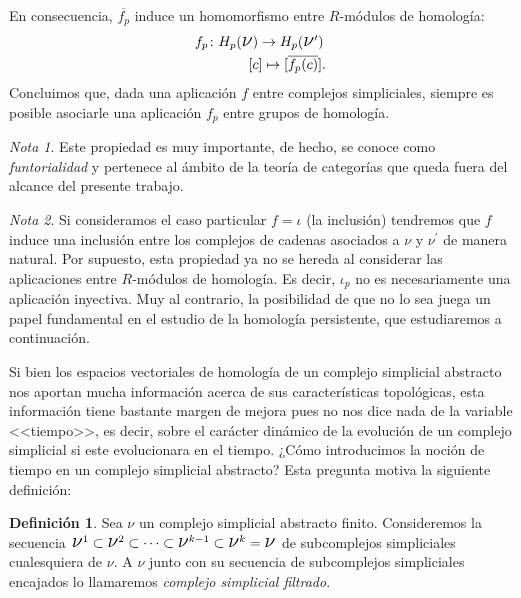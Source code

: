 \documentclass[12pt, a4paper, twoside]{book}
\numberwithin{equation}{section}
\theoremstyle{definition}
\newtheorem{defi}{Definición}[section]
\theoremstyle{remark}
\newtheorem*{remark}{Nota}
\theoremstyle{plain}
\begin{document}
	En consecuencia, $\overline{f_{p}}$ induce un 
	homomorfismo entre $R$-módulos de homología:	
		\begin{align*}
			\left.
			\begin{array}{l}
				f_{p}\colon H_{p}(\text{{\Large $\nu$}})
				\rightarrow 
				H_{p}(\text{{\Large $\nu$}}')\\[3pt] 
				\hspace{1.35cm} [c] \mapsto [\overline{f_{p}
				(c)}].
			\end{array}
			\right.
		\end{align*}
	Concluimos que, dada una aplicación $f$ entre complejos simpliciales, 
	siempre es posible asociarle una aplicación $f_{p}$ entre grupos de 
	homología.
	
	\begin{remark}
		Este propiedad es muy importante, de hecho, se conoce como 
		\emph{funtorialidad} y pertenece al ámbito de la teoría de 
		categorías que queda fuera del alcance del presente trabajo. 
	\end{remark}
	
	\begin{remark}
		Si consideramos el caso particular $f=\iota$ (la inclusión) 
		tendremos que $f$ induce una inclusión entre los complejos de 
		cadenas asociados a {\Large $\nu$} y 
		{\Large $\nu$}$^{\prime}$ de manera natural. Por supuesto, 
		esta propiedad ya no se hereda al considerar las aplicaciones 
		entre $R$-módulos de homología. Es decir, $\iota_{p}$ no es 
		necesariamente una aplicación inyectiva. Muy al contrario, 
		la posibilidad de que no lo sea juega un papel fundamental en 
		el estudio de la homología persistente, que estudiaremos a 
		continuación.	
	\end{remark}

	Si bien los espacios vectoriales de homología de un complejo 
	simplicial abstracto nos aportan mucha información acerca de sus 
	características topológicas, esta información tiene bastante margen de 
	mejora pues no nos dice nada de la variable <<tiempo>>, es decir, 
	sobre el carácter dinámico de la evolución de un complejo simplicial 
	si este evolucionara en el tiempo. ¿Cómo 
	introducimos la noción de tiempo en un complejo simplicial abstracto? 
	Esta pregunta motiva la siguiente definición:

	\begin{defi}
		Sea {\Large $\nu$} un complejo simplicial abstracto finito. 
		Consideremos la secuencia $ \text{{\Large $\nu$}$^{1}$} 
		\subset \text{{\Large $\nu$}$^{2}$} \subset \cdots \subset
		\text{{\Large $\nu$}$^{k-1}$} \subset 
		\text{{\Large $\nu$}$^{k}$} = \text{{\Large $\nu$}}$ de 
		subcomplejos simpliciales cualesquiera de {\Large $\nu$}. A
		{\Large $\nu$} junto con su secuencia de subcomplejos 
		simpliciales encajados lo llamaremos \textit{complejo 
		simplicial filtrado}. 
	\end{defi}
\end{document}
